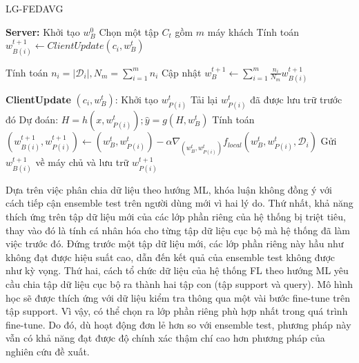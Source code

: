 \begin{algorithm}[H]
    \caption{LG-FEDAVG \cite{liang2020think}}\label{alg:lg_fedavg}
    \begin{algorithmic}[1]
        \State \textbf{Server:}
        \State Khởi tạo $w_B^0$
            \State Chọn một tập $C_t$ gồm $m$ máy khách
                \State Tính toán $w_{B(i)}^{t+1} \gets ClientUpdate(c_i,w_B^t)$
            \EndFor

            \State Tính toán $n_i = \left| \mathcal{D}_i \right|, N_m = \sum_{i=1}^m n_i$
            \State Cập nhật $w_B^{t+1} \gets \sum_{i=1}^m\frac{n_i}{N_m} w_{B(i)}^{t+1}$ %
        \EndFor

        \Statex

        \State \textbf{ClientUpdate} $(c_i, w_B^t)$: %
            \State Khởi tạo $w_{P(i)}^t$
        \Else
            \State Tải lại $w_{P(i)}^t$ đã được lưu trữ trước đó
        \EndIf
        \State Dự đoán: $H = h(x, w_{P(i)}^t); \hat{y} = g(H, w_B^t)$
        \State Tính toán $(w_{B(i)}^{t+1}, w_{P(i)}^{t+1}) \gets (w_{B}^t, w_{P(i)}^t) - \alpha\nabla_{(w_{B}^t, w_{P(i)}^t)} f_{local}(w_{B}^t, w_{P(i)}^t, \mathcal{D}_i)$
        \State Gửi $w_{B(i)}^{t+1}$ về máy chủ và lưu trữ $w_{P(i)}^{t+1}$
    \end{algorithmic}
\end{algorithm}

Dựa trên việc phân chia dữ liệu theo hướng ML, khóa luận không đồng ý với cách tiếp cận ensemble test trên người dùng mới vì hai lý do. Thứ nhất, khả năng thích ứng trên tập dữ liệu mới của các lớp phần riêng của hệ thống bị triệt tiêu, thay vào đó là tính cá nhân hóa cho từng tập dữ liệu cục bộ mà hệ thống đã làm việc trước đó. Đứng trước một tập dữ liệu mới, các lớp phần riêng này hầu như không đạt được hiệu suất cao, dẫn đến kết quả của ensemble test không được như kỳ vọng. Thứ hai, cách tổ chức dữ liệu của hệ thống FL theo hướng ML yêu cầu chia tập dữ liệu cục bộ ra thành hai tập con (tập support và query). Mô hình học sẽ được thích ứng với dữ liệu kiểm tra thông qua một vài bước fine-tune trên tập support. Vì vậy, có thể chọn ra lớp phần riêng phù hợp nhất trong quá trình fine-tune. Do đó, dù hoạt động đơn lẻ hơn so với ensemble test, phương pháp này vẫn có khả năng đạt được độ chính xác thậm chí cao hơn phương pháp của nghiên cứu \cite{liang2020think} đề xuất.



